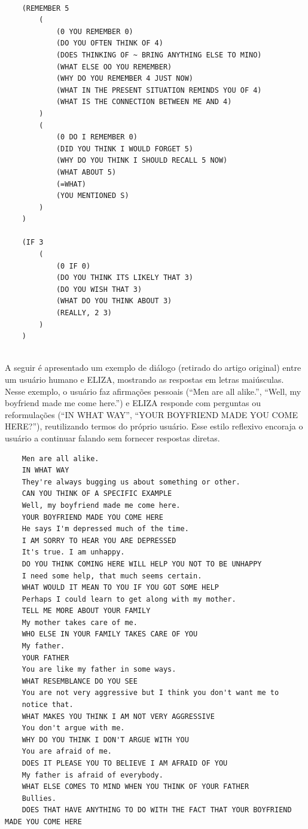 \documentclass[a4paper,oneside]{book}
\begin{document}
\begin{verbatim}
		
	(REMEMBER 5 
		(
			(0 YOU REMEMBER 0) 
			(DO YOU OFTEN THINK OF 4) 
			(DOES THINKING OF ~ BRING ANYTHING ELSE TO MINO) 
			(WHAT ELSE OO YOU REMEMBER)
			(WHY DO YOU REMEMBER 4 JUST NOW) 
			(WHAT IN THE PRESENT SITUATION REMINDS YOU OF 4) 
			(WHAT IS THE CONNECTION BETWEEN ME AND 4)
		) 
		(
			(0 DO I REMEMBER 0) 
			(DID YOU THINK I WOULD FORGET 5) 
			(WHY DO YOU THINK I SHOULD RECALL 5 NOW) 
			(WHAT ABOUT 5) 
			(=WHAT) 
			(YOU MENTIONED S)
		) 
	) 
	
	(IF 3 
		(
			(0 IF 0) 
			(DO YOU THINK ITS LIKELY THAT 3) 
			(DO YOU WISH THAT 3) 
			(WHAT DO YOU THINK ABOUT 3) 
			(REALLY, 2 3)
		)
	) 
	

\end{verbatim}


A seguir é apresentado um exemplo de diálogo (retirado do artigo original) entre um usuário humano e ELIZA, mostrando as respostas em letras maiúsculas. Nesse exemplo, o usuário faz afirmações pessoais (“Men are all alike.”, “Well, my boyfriend made me come here.”) e ELIZA responde com perguntas ou reformulações (“IN WHAT WAY”, “YOUR BOYFRIEND MADE YOU COME HERE?”), reutilizando termos do próprio usuário. Esse estilo reflexivo encoraja o usuário a continuar falando sem fornecer respostas diretas.

\begin{verbatim}
	Men are all alike. 
	IN WHAT WAY 
	They're always bugging us about something or other. 
	CAN YOU THINK OF A SPECIFIC EXAMPLE 
	Well, my boyfriend made me come here. 
	YOUR BOYFRIEND MADE YOU COME HERE 
	He says I'm depressed much of the time. 
	I AM SORRY TO HEAR YOU ARE DEPRESSED 
	It's true. I am unhappy. 
	DO YOU THINK COMING HERE WILL HELP YOU NOT TO BE UNHAPPY 
	I need some help, that much seems certain. 
	WHAT WOULD IT MEAN TO YOU IF YOU GOT SOME HELP 
	Perhaps I could learn to get along with my mother. 
	TELL ME MORE ABOUT YOUR FAMILY 
	My mother takes care of me. 
	WHO ELSE IN YOUR FAMILY TAKES CARE OF YOU 
	My father. 
	YOUR FATHER 
	You are like my father in some ways. 
	WHAT RESEMBLANCE DO YOU SEE 
	You are not very aggressive but I think you don't want me to 
	notice that. 
	WHAT MAKES YOU THINK I AM NOT VERY AGGRESSIVE 
	You don't argue with me. 
	WHY DO YOU THINK I DON'T ARGUE WITH YOU 
	You are afraid of me. 
	DOES IT PLEASE YOU TO BELIEVE I AM AFRAID OF YOU 
	My father is afraid of everybody. 
	WHAT ELSE COMES TO MIND WHEN YOU THINK OF YOUR FATHER 
	Bullies. 
	DOES THAT HAVE ANYTHING TO DO WITH THE FACT THAT YOUR BOYFRIEND MADE YOU COME HERE 
\end{verbatim}
	
\end{document}
